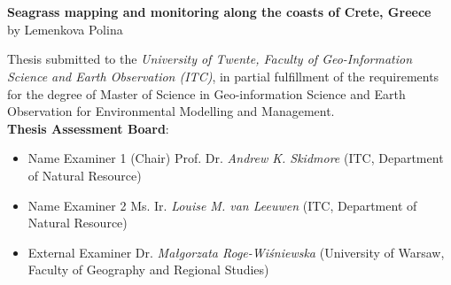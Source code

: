 \documentclass[11pt]{article}
\begin{document}
\begin{figure}[H]
	\centering
	\hspace{3mm}
	\hspace{3mm}
	\hspace{3mm}
\end{figure}

\pagebreak


\section*{}
\begin{center}
\textbf{Seagrass mapping and monitoring along the coasts of Crete, Greece}\\
\vspace{1em}
by Lemenkova Polina
\end{center}

Thesis submitted to the \textit{University of Twente, Faculty of Geo-Information Science and Earth Observation (ITC)}, in partial fulfillment of the requirements
for the degree of Master of Science in Geo-information Science and Earth Observation for
Environmental Modelling and Management.\\

\textbf{Thesis Assessment Board}:
\begin{itemize}
	\item Name Examiner 1 (Chair) \hfill{Prof. Dr. \textit{Andrew K. Skidmore} (ITC, Department of Natural Resource)}
	\item Name Examiner 2 \hfill{Ms. Ir. \textit{Louise M. van Leeuwen} (ITC, Department of Natural Resource)}
	\item External Examiner \hfill{Dr. {\textit{Ma\l{}gorzata Roge-Wi\'sniewska}} (University of Warsaw, Faculty of Geography and Regional Studies)}
\end{itemize}
\end{document}
